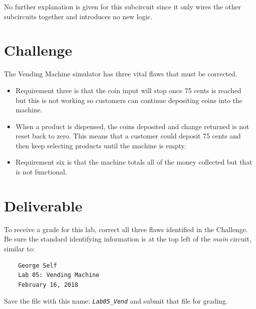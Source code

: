 No further explanation is given for this subcircuit since it only wires the other subcircuits together and introduces no new logic.

\section{Challenge}

The Vending Machine simulator has three vital flaws that must be corrected.

\begin{itemize}
	\item Requirement three is that the coin input will stop once 75 cents is reached but this is not working so customers can continue depositing coins into the machine.
	\item When a product is dispensed, the coins deposited and change returned is not reset back to zero. This means that a customer could deposit 75 cents and then keep selecting products until the machine is empty.
	\item Requirement six is that the machine totals all of the money collected but that is not functional.
\end{itemize}


\section{Deliverable}

To receive a grade for this lab, correct all three flaws identified in the Challenge. Be sure the standard identifying information is at the top left of the \textit{main} circuit, similar to: 

\bigskip
\begin{minipage}{\linewidth}
	\begin{verbatim}
	George Self
	Lab 05: Vending Machine
	February 16, 2018
	\end{verbatim}
\end{minipage}
\bigskip

Save the file with this name: \emph{\texttt{Lab05\_Vend}} and submit that file for grading.

